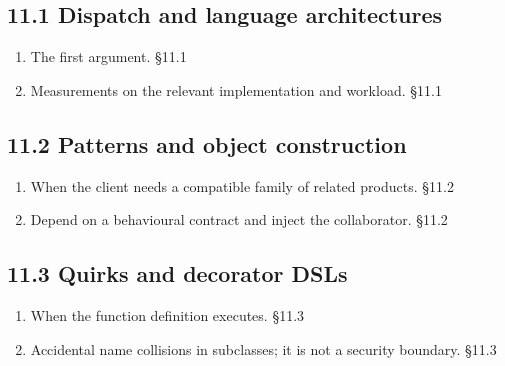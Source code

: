 \documentclass[11pt]{article}
\begin{document}
\begin{keepsection}\subsection{11.1 Dispatch and language architectures}

\begin{enumerate}
\item The first argument. \hfill{\small\color{FAUblue}§11.1}
\item Measurements on the relevant implementation and workload. \hfill{\small\color{FAUblue}§11.1}
\end{enumerate}

\end{keepsection}
\begin{keepsection}\subsection{11.2 Patterns and object construction}

\begin{enumerate}
\item When the client needs a compatible family of related products. \hfill{\small\color{FAUblue}§11.2}
\item Depend on a behavioural contract and inject the collaborator. \hfill{\small\color{FAUblue}§11.2}
\end{enumerate}

\end{keepsection}
\begin{keepsection}\subsection{11.3 Quirks and decorator DSLs}

\begin{enumerate}
\item When the function definition executes. \hfill{\small\color{FAUblue}§11.3}
\item Accidental name collisions in subclasses; it is not a security boundary. \hfill{\small\color{FAUblue}§11.3}
\end{enumerate}

\end{keepsection}
\end{document}

